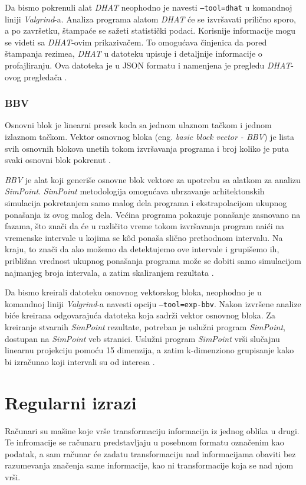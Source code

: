 \documentclass[12pt,oneside]{memoir}
\theoremstyle{plain}
\theoremstyle{definition}
\begin{document}
Da bismo pokrenuli alat \textit{ DHAT} neophodno je navesti \texttt{–tool=dhat} u komandnoj liniji \textit{Valgrind}-a. Analiza programa alatom \textit{DHAT} će se izvršavati prilično sporo, a po završetku, štampaće se sažeti statistički podaci. Korisnije informacije mogu se videti sa \textit{DHAT}-ovim prikazivačem. To omogućava činjenica da pored štampanja rezimea, \textit{DHAT} u datoteku upisuje i detaljnije informacije o profajliranju. Ova datoteka je u JSON formatu i namenjena je pregledu \textit{DHAT}-ovog pregledača \cite{DHAT}. 

\subsection{BBV}

Osnovni blok je linearni presek koda sa jednom ulaznom tačkom i jednom izlaznom tačkom. Vektor osnovnog bloka (eng. \textit{basic block vector - BBV}) je lista svih osnovnih blokova unetih tokom izvršavanja programa i broj koliko je puta svaki osnovni blok pokrenut \cite{BBV}. 

\textit{BBV} je alat koji generiše osnovne blok vektore za upotrebu sa alatkom za analizu \textit{SimPoint}. \textit{SimPoint} metodologija omogućava ubrzavanje arhitektonskih simulacija pokretanjem samo malog dela programa i ekstrapolacijom ukupnog ponašanja iz ovog malog dela. Većina programa pokazuje ponašanje zasnovano na fazama, što znači da će u različito vreme tokom izvršavanja program naići na vremenske intervale u kojima se k\^od ponaša slično prethodnom intervalu. Na kraju, to znači da ako možemo da detektujemo ove intervale i grupišemo ih, približna vrednost ukupnog ponašanja programa može se dobiti samo simulacijom najmanjeg broja intervala, a zatim skaliranjem rezultata \cite{BBV}.

Da bismo kreirali datoteku osnovnog vektorskog bloka, neophodno je u komandnoj liniji \textit{Valgrind}-a navesti opciju \texttt{–tool=exp-bbv}. Nakon izvršene analize biće kreirana odgovarajuća datoteka koja sadrži vektor osnovnog bloka. Za kreiranje stvarnih \textit{SimPoint} rezultate, potreban je uslužni program \textit{SimPoint}, dostupan na \textit{SimPoint} veb stranici. Uslužni program \textit{SimPoint} vrši slučajnu linearnu projekciju pomoću 15 dimenzija, a zatim k-dimenziono grupisanje kako bi izračunao koji intervali su od interesa \cite{BBV}.  

\chapter{Regularni izrazi}
Računari su mašine koje vrše transformaciju informacija iz jednog oblika u drugi. Te infromacije se računaru predstavljaju u posebnom formatu označenim  kao podatak, a sam računar će zadatu transformaciju nad informacijama obaviti bez razumevanja značenja same informacije, kao ni transformacije koja se nad njom vrši.
\end{document}
